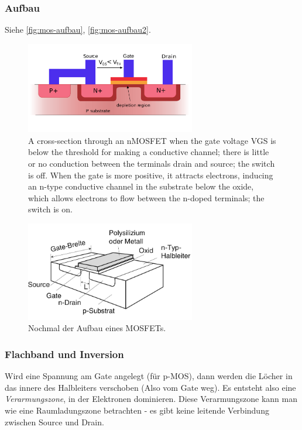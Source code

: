     \subsubsection{Aufbau}
    Siehe \autoref{fig:mos-aufbau}, \autoref{fig:mos-aufbau2}.
    \begin{figure}[H]
        \centering
        \includegraphics[width=0.66\textwidth]{fig/mos-aufbau.png}
        \caption{A cross-section through an nMOSFET when the gate voltage VGS is below the threshold for making a conductive channel; there is little or no conduction between the terminals drain and source; the switch is off. When the gate is more positive, it attracts electrons, inducing an n-type conductive channel in the substrate below the oxide, which allows electrons to flow between the n-doped terminals; the switch is on.}
        \label{fig:mos-aufbau}
    \end{figure}
    
    \begin{figure}[H]
        \centering
        \includegraphics[width=0.66\textwidth]{fig/mos-aufbau2}
        \caption{Nochmal der Aufbau eines MOSFETs.}
        \label{fig:mos-aufbau2}
    \end{figure}
    
    \subsubsection{Flachband und Inversion}
    Wird eine Spannung am Gate angelegt (für p-MOS), dann werden die Löcher in das innere des Halbleiters verschoben (Also vom Gate weg). Es entsteht also eine \textit{Verarmungszone}, in der Elektronen dominieren. Diese Verarmungszone kann man wie eine Raumladungszone betrachten - es gibt keine leitende Verbindung zwischen Source und Drain.
    
